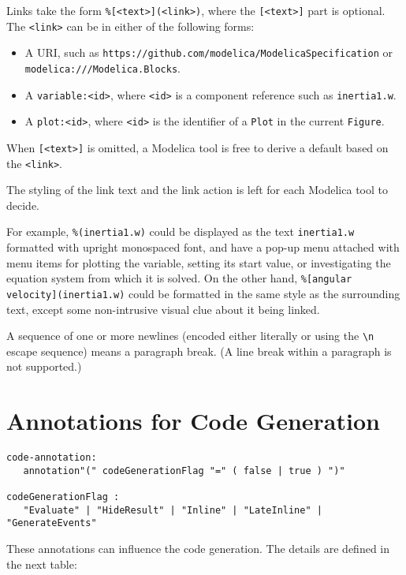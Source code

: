 Links take the form \lstinline!%[<text>](<link>)!, where the
\lstinline![<text>]! part is optional. The \lstinline!<link>! can be in either
of the following forms:
\begin{itemize}
\item A URI, such as
\lstinline!https://github.com/modelica/ModelicaSpecification! or
\lstinline!modelica:///Modelica.Blocks!.
\item A \lstinline!variable:<id>!, where \lstinline!<id>! is a component
reference such as \lstinline!inertia1.w!.
\item A \lstinline!plot:<id>!, where \lstinline!<id>! is the identifier of a
\lstinline!Plot! in the current \lstinline!Figure!.
\end{itemize}

When \lstinline![<text>]! is omitted, a Modelica tool is free to derive a default based on
the \lstinline!<link>!.

The styling of the link text and the link action is left for each Modelica tool
to decide.

\begin{nonnormative}
For example, \lstinline!%(inertia1.w)! could be displayed as the text
\lstinline!inertia1.w! formatted with upright monospaced font, and have a pop-up
menu attached with menu items for plotting the variable, setting its start
value, or investigating the equation system from which it is solved.  On the
other hand, \lstinline!%[angular velocity](inertia1.w)! could be formatted in
the same style as the surrounding text, except some non-intrusive visual clue
about it being linked.
\end{nonnormative}

A sequence of one or more newlines (encoded either literally or using the \lstinline!\n!
escape sequence) means a paragraph break.  (A line break within a paragraph is
not supported.)

\section{Annotations for Code Generation}
\begin{lstlisting}[language=grammar]
code-annotation:
   annotation"(" codeGenerationFlag "=" ( false | true ) ")"

codeGenerationFlag :
   "Evaluate" | "HideResult" | "Inline" | "LateInline" | "GenerateEvents"
\end{lstlisting}
These annotations can influence the code generation. The details are
defined in the next table:

